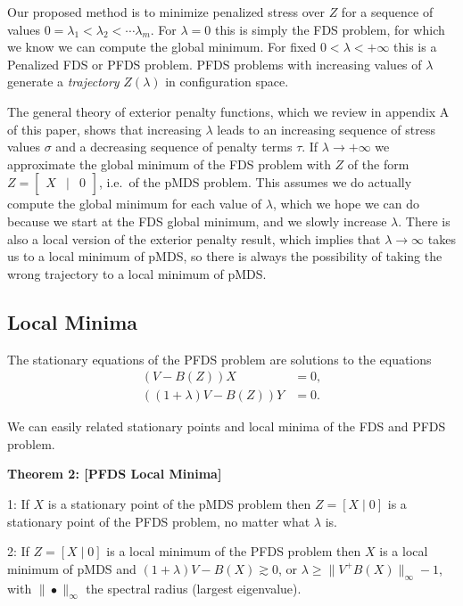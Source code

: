 \documentclass[
  12pt,
]{article}
\begin{document}
Our proposed method is to minimize penalized stress over \(Z\) for a
sequence of values \(0=\lambda_1<\lambda_2<\cdots\lambda_m\). For
\(\lambda=0\) this is simply the FDS problem, for which we know we can
compute the global minimum. For fixed \(0<\lambda<+\infty\) this is a
Penalized FDS or PFDS problem. PFDS problems with increasing values of
\(\lambda\) generate a \emph{trajectory} \(Z(\lambda)\) in configuration
space.

The general theory of exterior penalty functions, which we review in
appendix A of this paper, shows that increasing \(\lambda\) leads to an
increasing sequence of stress values \(\sigma\) and a decreasing
sequence of penalty terms \(\tau\). If \(\lambda\rightarrow+\infty\) we
approximate the global minimum of the FDS problem with \(Z\) of the form
\(Z=\begin{bmatrix}X&\mid&0\end{bmatrix}\), i.e.~of the pMDS problem.
This assumes we do actually compute the global minimum for each value of
\(\lambda\), which we hope we can do because we start at the FDS global
minimum, and we slowly increase \(\lambda\). There is also a local
version of the exterior penalty result, which implies that
\(\lambda\rightarrow\infty\) takes us to a local minimum of pMDS, so
there is always the possibility of taking the wrong trajectory to a
local minimum of pMDS.

\subsection{Local Minima}\label{local-minima}

The stationary equations of the PFDS problem are solutions to the
equations \begin{align}
(V-B(Z))X&=0,\\
((1+\lambda)V-B(Z))Y&=0.
\end{align}

We can easily related stationary points and local minima of the FDS and
PFDS problem.

\textbf{Theorem 2: {[}PFDS Local Minima{]}}

1: If \(X\) is a stationary point of the pMDS problem then
\(Z=[X\mid 0]\) is a stationary point of the PFDS problem, no matter
what \(\lambda\) is.

2: If \(Z=[X\mid 0]\) is a local minimum of the PFDS problem then \(X\)
is a local minimum of pMDS and \((1+\lambda)V-B(X)\gtrsim 0\), or
\(\lambda\geq\|V^+B(X)\|_\infty-1\), with \(\|\bullet\|_\infty\) the
spectral radius (largest eigenvalue).
\end{document}
